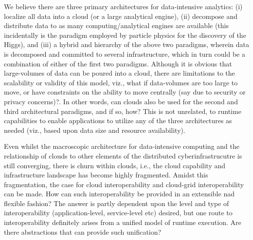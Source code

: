 \documentclass[times]{cpeauth}
\newcommand{\alnote}[1]{ {\textcolor{green} { ***andreL: #1 }}}
\newcommand{\alnote}[1]{}
\begin{document}
We believe there are three primary architectures for data-intensive
analytics: (i) localize all data into a cloud (or a large analytical
engine), (ii) decompose and distribute data to as many
computing/analytical engines are available (this incidentally is the
paradigm employed by particle physics for the discovery of the Higgs),
and (iii) a hybrid and hierarchy of the above two paradigms, wherein
data is decomposed and committed to several infrastructure, which in
turn could be a combination of either of the first two paradigms.
Although it is obvious that large-volumes of data can be poured into a
cloud, there are limitations to the scalability or validity of this
model, viz., what if data-volumes are too large to move, or have
constraints on the ability to move centrally (say due to security or
privacy concerns)?. In other words, can clouds also be used for the
second and third architectural paradigms, and if so,
how? %
This is not unrelated, to runtime capabilities to enable applications
to utilize any of the three architectures as needed (viz., based upon
data size and resource availability).



Even whilst the macroscopic architecture for data-intensive computing
and the relationship of clouds to other elements of the distributed
cyberinfrastrucutre is still converging, there is churn within clouds,
i.e., the cloud capability and infrastructure landscape has become
highly fragmented. Amidst this fragmentation, 
the case for cloud interoperability and cloud-grid interoperability
can be made. %
How can such interoperability be provided in an extensible nad
flexible fashion?  The answer is partly dependent upon the level and
type of interoperability (application-level, service-level etc)
desired, but one route to interoperability definitely arises from a
unified model of runtime execution.  Are there abstractions that can
provide such unification?
\end{document}
